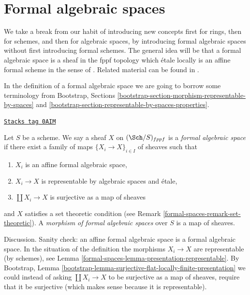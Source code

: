 \section{Formal algebraic spaces}
\label{formal-spaces-section-formal-algebraic-spaces}
We take a break from our habit of introducing new concepts first
for rings, then for schemes, and then for algebraic spaces, by
introducing formal algebraic spaces without first introducing
formal schemes. The general idea will be that a formal algebraic space
is a sheaf in the fppf topology which \'etale locally is an
affine formal scheme in the sense of \cite{BVGD}.
Related material can be found in \cite{Yasuda}.

\medskip\noindent
In the definition of a formal algebraic space we are going to
borrow some terminology from
Bootstrap, Sections
\ref{bootstrap-section-morphism-representable-by-spaces} and
\ref{bootstrap-section-representable-by-spaces-properties}.

\begin{definition}
\label{formal-spaces-definition-formal-algebraic-space}
\href{https://stacks.math.columbia.edu/tag/0AIM}{\texttt{Stacks tag 0AIM}}

Let $S$ be a scheme. We say a sheaf $X$ on $(\Sch/S)_{fppf}$ is a
{\it formal algebraic space} if there exist a family of maps
$\{X_i \to X\}_{i \in I}$ of sheaves such that
\begin{enumerate}
\item $X_i$ is an affine formal algebraic space,
\item $X_i \to X$ is representable by algebraic spaces and \'etale,
\item $\coprod X_i \to X$ is surjective as a map of sheaves
\end{enumerate}
and $X$ satisfies a set theoretic condition
(see Remark \ref{formal-spaces-remark-set-theoretic}). A
{\it morphism of formal algebraic spaces}
over $S$ is a map of sheaves.
\end{definition}

Discussion. Sanity check: an affine formal algebraic space is
a formal algebraic space. In the situation of the definition
the morphisms $X_i \to X$ are representable (by schemes), see
Lemma \ref{formal-spaces-lemma-presentation-representable}.
By Bootstrap, Lemma
\ref{bootstrap-lemma-surjective-flat-locally-finite-presentation}
we could instead of asking $\coprod X_i \to X$
to be surjective as a map of sheaves, require that it be
surjective (which makes sense because it is representable).

